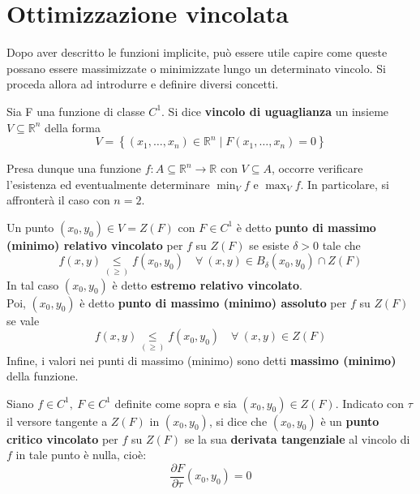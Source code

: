 \section{Ottimizzazione vincolata}
Dopo aver descritto le funzioni implicite, può essere utile capire come queste possano essere massimizzate o minimizzate lungo un determinato vincolo. Si proceda allora ad introdurre e definire diversi concetti.
\begin{definition} \label{Def: Vincolo di uguaglianza}
Sia F una funzione di classe $C^1$. Si dice \textbf{vincolo di uguaglianza} un insieme $V \subseteq \mathbb{R}^n$ della forma
\begin{equation}
    V= \left\{(x_1, \dots, x_n) \in \mathbb{R}^n \mid F(x_1, \dots, x_n)=0 \right\}
\end{equation}
\end{definition}
Presa dunque una funzione $f:A\subseteq \mathbb{R}^n \to \mathbb{R}$ con $V \subseteq A$, occorre verificare l'esistenza ed eventualmente determinare $\min_{V}{f}$ e $\max_{V}{f}$.
In particolare, si affronterà il caso con $n=2$.
\begin{definition} \label{Def: Estremi vincolati}
    Un punto $(x_0, y_0) \in V= Z(F)$ con $F \in C^1$ è detto \textbf{punto di massimo (minimo) relativo vincolato} per $f$ su $Z(F)$ se esiste $\delta>0$ tale che 
    \begin{equation}
        f(x,y) \underset{(\geq)}{\leq} f(x_0, y_0) \quad \forall\ (x, y) \in B_\delta(x_0, y_0) \cap Z(F)
    \end{equation}
    In tal caso $(x_0, y_0)$ è detto \textbf{estremo relativo vincolato}.\\
    Poi, $(x_0, y_0)$ è detto \textbf{punto di massimo (minimo) assoluto} per $f$ su $Z(F)$ se vale
    \begin{equation}
        f(x, y) \underset{(\geq)}{\leq} f(x_0, y_0) \quad \forall\ (x, y) \in Z(F)
    \end{equation}
    Infine, i valori nei punti di massimo (minimo) sono detti \textbf{massimo (minimo)} della funzione.
\end{definition}
\begin{definition} \label{Punto critico vincolato}
    Siano $f \in C^1,\ F \in C^1$ definite come sopra e sia $(x_0, y_0) \in Z(F)$. Indicato con $\tau$ il versore tangente a $Z(F)$ in $(x_0, y_0)$, si dice che $(x_0, y_0)$ è un \textbf{punto critico vincolato} per $f$ su $Z(F)$ se la sua \textbf{derivata tangenziale} al vincolo di $f$ in tale punto è nulla, cioè:
    \begin{equation} \label{Eq: Derivata tangenziale}
        \frac{\partial{F}}{\partial \tau}(x_0, y_0)=0 
    \end{equation}
\end{definition}
